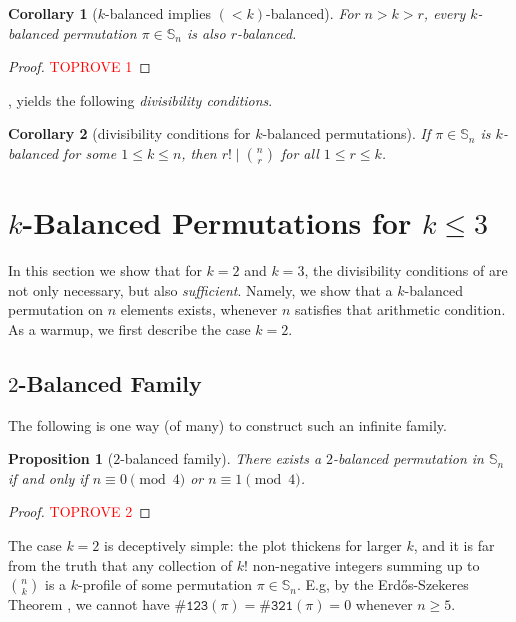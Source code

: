 \documentclass{article}
\newtheorem{corollary}{Corollary}[theorem]
\newtheorem{proposition}[theorem]{Proposition}
\newcommand{\twob}{$2$-balanced\xspace}
\newcommand{\Sn}{\mathbb{S}_n}
\newcommand{\pc}[2]{{\# \mathtt{ #1 } \left( #2 \right)}}
\newcommand{\ESZ}{Erd\H{o}s-Szekeres\xspace}
\theoremstyle{remark}
\theoremstyle{plain}
\begin{document}
\begin{corollary}[$k$-balanced implies $(<k)$-balanced]
    \label{cor:k_bal_implies_lt_k_bal}
For $n>k>r$, every $k$-balanced permutation $\pi \in \Sn$ is also $r$-balanced.
\end{corollary}
\begin{proof}\textcolor{red}{TOPROVE 1}\end{proof}

, yields the following \emph{divisibility conditions}.

\begin{corollary}[divisibility conditions for $k$-balanced permutations]
    \label{cor:div_conds}
    If $\pi \in \Sn$ is $k$-balanced for some $1 \leq k \le n$, then $r! \mid \binom{n}{r}$ for all $1 \leq r \le k$.
\end{corollary}
 \section{\texorpdfstring{$k$}{k}-Balanced Permutations for \texorpdfstring{$k\le3$}{k<=3}}
\label{section:3balanced_construction}

In this section we show that for $k=2$ and $k=3$, the  divisibility conditions 
of  are not only necessary, but also \emph{sufficient}.
Namely, we show that a $k$-balanced permutation on $n$ elements 
exists, whenever $n$ satisfies that arithmetic condition.
As a warmup, we first describe the case $k=2$.

\subsection{\texorpdfstring{$2$}{2}-Balanced Family}
\label{subsect:2bal_construction}

The following is one way (of many) to construct such an infinite family.

\begin{proposition}[$2$-balanced family]
There exists a \twob permutation in $\Sn$ if and only if 
\mbox{$n\equiv 0 \pmod 4$} or $n\equiv 1 \pmod 4$.
\end{proposition}

\begin{proof}\textcolor{red}{TOPROVE 2}\end{proof}

The case $k=2$ is deceptively simple: the plot thickens for larger $k$, and
it is far from the truth that 
any collection of $k!$ non-negative integers summing up to $\binom{n}{k}$ is a $k$-profile of some permutation $\pi \in \Sn$. E.g, by the \ESZ Theorem \cite{erdos1935combinatorial}, we cannot have $\pc{123}{\pi}=\pc{321}{\pi}=0$ whenever $n\geq 5$. 
\end{document}
